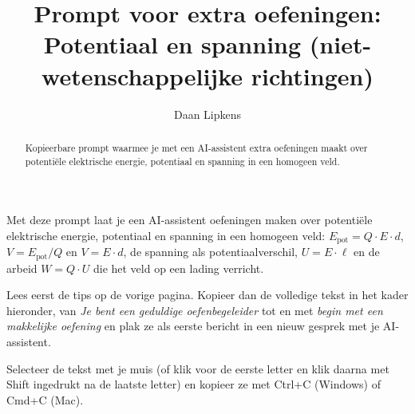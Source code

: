 \documentclass{ximera}
\title{Prompt voor extra oefeningen: Potentiaal en spanning (niet-wetenschappelijke richtingen)}
\author{Daan Lipkens}
\begin{document}
\begin{abstract}
    Kopieerbare prompt waarmee je met een AI-assistent extra oefeningen maakt over potentiële elektrische energie, potentiaal en spanning in een homogeen veld.
\end{abstract}
\maketitle

Met deze prompt laat je een AI-assistent oefeningen maken over potentiële elektrische energie, potentiaal en spanning in een homogeen veld: $E_{\text{pot}} = Q \cdot E \cdot d$, $V = E_{\text{pot}}/Q$ en $V = E \cdot d$, de spanning als potentiaalverschil, $U = E \cdot \ell$ en de arbeid $W = Q \cdot U$ die het veld op een lading verricht.

Lees eerst de tips op de vorige pagina. Kopieer dan de volledige tekst in het kader hieronder, van \textit{Je bent een geduldige oefenbegeleider} tot en met \textit{begin met een makkelijke oefening} en plak ze als eerste bericht in een nieuw gesprek met je AI-assistent.

\begin{onlineOnly}
    Selecteer de tekst met je muis (of klik voor de eerste letter en klik daarna met Shift ingedrukt na de laatste letter) en kopieer ze met Ctrl+C (Windows) of Cmd+C (Mac).
\end{onlineOnly}
\end{document}
